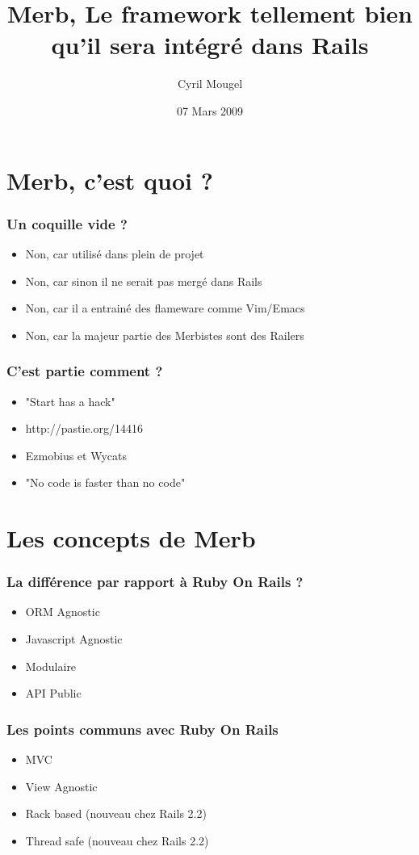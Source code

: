 \documentclass{beamer}
\title{Merb, Le framework tellement bien qu'il sera intégré dans Rails}
\author{Cyril Mougel}
\date{07 Mars 2009}
\begin{document}
\begin{frame}
    \titlepage
\end{frame}

\section{Merb, c'est quoi ?}

\begin{frame}
	\frametitle{Un coquille vide ?}
	\begin{itemize}
		\item Non, car utilisé dans plein de projet
		\item Non, car sinon il ne serait pas mergé dans Rails
		\item Non, car il a entrainé des flameware comme Vim/Emacs
        \item Non, car la majeur partie des Merbistes sont des Railers
	\end{itemize}
\end{frame}

\begin{frame}
    \frametitle{C'est partie comment ?}
    \begin{itemize}
        \item "Start has a hack"
        \item http://pastie.org/14416
        \item Ezmobius et Wycats
        \item "No code is faster than no code"
    \end{itemize}
\end{frame}

\section{Les concepts de Merb}

\begin{frame}
    \frametitle{La différence par rapport à Ruby On Rails ?}
    \begin{itemize}
        \item ORM Agnostic
        \item Javascript Agnostic
        \item Modulaire
        \item API Public
    \end{itemize}
\end{frame}

\begin{frame}
    \frametitle{Les points communs avec Ruby On Rails}
    \begin{itemize}
        \item MVC
        \item View Agnostic
        \item Rack based (nouveau chez Rails 2.2)
        \item Thread safe (nouveau chez Rails 2.2)
    \end{itemize}
\end{frame}
\end{document}
